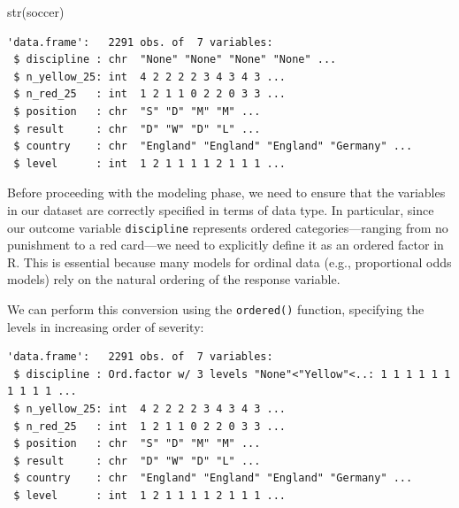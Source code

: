 \documentclass[
  letterpaper,
  DIV=11,
  numbers=noendperiod]{scrartcl}
\newenvironment{Shaded}{\begin{snugshade}}{\end{snugshade}}
\newcommand{\AttributeTok}[1]{\textcolor[rgb]{0.40,0.45,0.13}{#1}}
\newcommand{\CommentTok}[1]{\textcolor[rgb]{0.37,0.37,0.37}{#1}}
\newcommand{\FunctionTok}[1]{\textcolor[rgb]{0.28,0.35,0.67}{#1}}
\newcommand{\NormalTok}[1]{\textcolor[rgb]{0.00,0.23,0.31}{#1}}
\newcommand{\OtherTok}[1]{\textcolor[rgb]{0.00,0.23,0.31}{#1}}
\newcommand{\SpecialCharTok}[1]{\textcolor[rgb]{0.37,0.37,0.37}{#1}}
\newcommand{\StringTok}[1]{\textcolor[rgb]{0.13,0.47,0.30}{#1}}
\begin{document}
\begin{Shaded}
\begin{Highlighting}[]
\FunctionTok{str}\NormalTok{(soccer)}
\end{Highlighting}
\end{Shaded}

\begin{verbatim}
'data.frame':   2291 obs. of  7 variables:
 $ discipline : chr  "None" "None" "None" "None" ...
 $ n_yellow_25: int  4 2 2 2 2 3 4 3 4 3 ...
 $ n_red_25   : int  1 2 1 1 0 2 2 0 3 3 ...
 $ position   : chr  "S" "D" "M" "M" ...
 $ result     : chr  "D" "W" "D" "L" ...
 $ country    : chr  "England" "England" "England" "Germany" ...
 $ level      : int  1 2 1 1 1 1 2 1 1 1 ...
\end{verbatim}

Before proceeding with the modeling phase, we need to ensure that the
variables in our dataset are correctly specified in terms of data type.
In particular, since our outcome variable \texttt{discipline} represents
ordered categories---ranging from no punishment to a red card---we need
to explicitly define it as an ordered factor in R. This is essential
because many models for ordinal data (e.g., proportional odds models)
rely on the natural ordering of the response variable.

We can perform this conversion using the \texttt{ordered()} function,
specifying the levels in increasing order of severity:

\begin{Shaded}
\end{Shaded}

\begin{verbatim}
'data.frame':   2291 obs. of  7 variables:
 $ discipline : Ord.factor w/ 3 levels "None"<"Yellow"<..: 1 1 1 1 1 1 1 1 1 1 ...
 $ n_yellow_25: int  4 2 2 2 2 3 4 3 4 3 ...
 $ n_red_25   : int  1 2 1 1 0 2 2 0 3 3 ...
 $ position   : chr  "S" "D" "M" "M" ...
 $ result     : chr  "D" "W" "D" "L" ...
 $ country    : chr  "England" "England" "England" "Germany" ...
 $ level      : int  1 2 1 1 1 1 2 1 1 1 ...
\end{verbatim}
\end{document}
